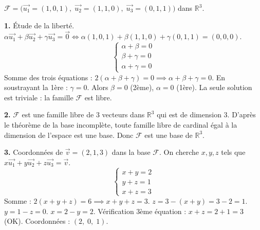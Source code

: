 \documentclass[11pt]{article}
\newcommand{\cle}[1]{{\popxbold\color{popdark}#1}}
\begin{document}
\begin{corrige}
$\mathcal{F}=\big(\vec{u_1}=(1,0,1),\;\vec{u_2}=(1,1,0),\;\vec{u_3}=(0,1,1)\big)$ dans $\mathbb{R}^3$.

\textbf{1.} Étude de la liberté.
$\alpha\vec{u_1}+\beta\vec{u_2}+\gamma\vec{u_3}=\vec{0} \iff \alpha(1,0,1)+\beta(1,1,0)+\gamma(0,1,1)=(0,0,0)$.
\[ \begin{cases} \alpha + \beta = 0 \\ \beta + \gamma = 0 \\ \alpha + \gamma = 0 \end{cases} \]
Somme des trois équations : $2(\alpha+\beta+\gamma)=0 \implies \alpha+\beta+\gamma=0$.
En soustrayant la 1ère : $\gamma=0$. Alors $\beta=0$ (2ème), $\alpha=0$ (1ère).
La seule solution est triviale : la famille $\mathcal{F}$ est \cle{libre}.

\textbf{2.} $\mathcal{F}$ est une famille libre de $3$ vecteurs dans $\mathbb{R}^3$ qui est de dimension $3$.
D'après le \cle{théorème de la base incomplète}, toute famille libre de cardinal égal à la dimension de l'espace est une \cle{base}.
Donc $\mathcal{F}$ est une base de $\mathbb{R}^3$.

\textbf{3.} Coordonnées de $\vec{v}=(2,1,3)$ dans la base $\mathcal{F}$.
On cherche $x,y,z$ tels que $x\vec{u_1}+y\vec{u_2}+z\vec{u_3}=\vec{v}$.
\[ \begin{cases} x + y = 2 \\ y + z = 1 \\ x + z = 3 \end{cases} \]
Somme : $2(x+y+z)=6 \implies x+y+z=3$.
$z = 3 - (x+y) = 3-2 = 1$.
$y = 1 - z = 0$.
$x = 2 - y = 2$.
Vérification 3ème équation : $x+z=2+1=3$ (OK).
Coordonnées : $\boxed{(2,\;0,\;1)}$.
\end{corrige}
\end{document}
